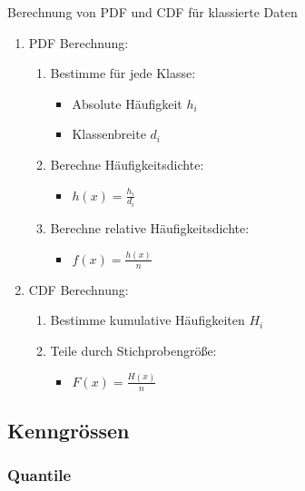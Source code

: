 \begin{KR}{Berechnung von PDF und CDF für klassierte Daten}
\begin{enumerate}
    \item PDF Berechnung:
        \begin{enumerate}
            \item Bestimme für jede Klasse:
                \begin{itemize}
                    \item Absolute Häufigkeit $h_i$
                    \item Klassenbreite $d_i$
                \end{itemize}
            \item Berechne Häufigkeitsdichte:
                \begin{itemize}
                    \item $h(x) = \frac{h_i}{d_i}$
                \end{itemize}
            \item Berechne relative Häufigkeitsdichte:
                \begin{itemize}
                    \item $f(x) = \frac{h(x)}{n}$
                \end{itemize}
        \end{enumerate}
    \item CDF Berechnung:
        \begin{enumerate}
            \item Bestimme kumulative Häufigkeiten $H_i$
            \item Teile durch Stichprobengröße:
                \begin{itemize}
                    \item $F(x) = \frac{H(x)}{n}$
                \end{itemize}
        \end{enumerate}
\end{enumerate}
\end{KR}



\subsection{Kenngrössen}

\subsubsection{Quantile}

